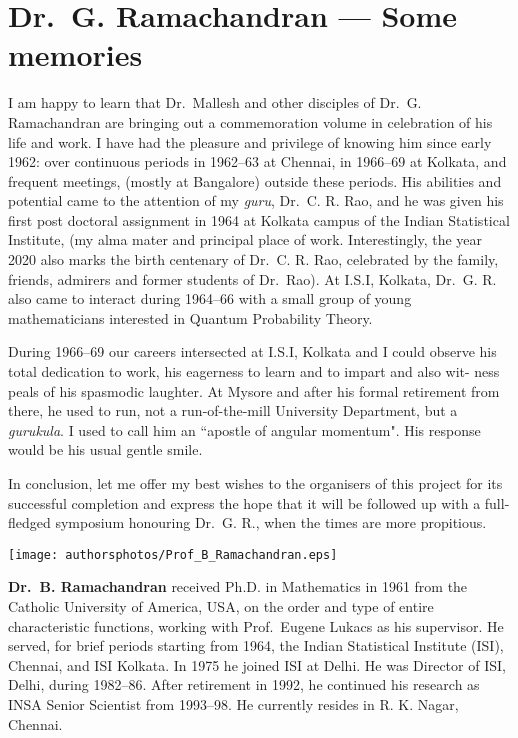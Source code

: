 \chapter{Dr.\ G. Ramachandran --- Some memories}\label{chap10}



I am happy to learn that Dr.\ Mallesh and other disciples of Dr.\ G. Ramachandran are bringing out a commemoration volume in celebration of his life
and work. I have had the pleasure and privilege of knowing him since early
1962: over continuous periods in 1962--63 at Chennai, in 1966--69 at Kolkata,
and frequent meetings, (mostly at Bangalore) outside these periods. His abilities and potential came 
to the attention of my \textit{guru}, Dr.\ C. R. Rao, and he was
given his first post doctoral assignment in 1964 at Kolkata campus of the Indian
Statistical Institute, (my alma mater and principal place of work. Interestingly,
the year 2020 also marks the birth centenary of Dr.\ C. R. Rao, celebrated by
the family, friends, admirers and former students of Dr.\ Rao). At I.S.I, Kolkata,
Dr.\ G. R. also came to interact during 1964--66 with a small group of young
mathematicians interested in Quantum Probability Theory.

During 1966--69 our careers intersected at I.S.I, Kolkata and I could observe
his total dedication to work, his eagerness to learn and to impart and also wit-
ness peals of his spasmodic laughter. At Mysore and after his formal retirement
from there, he used to run, not a run-of-the-mill University Department, but a
\textit{gurukula}. I used to call him an ``apostle of angular momentum". His response
would be his usual gentle smile.


In conclusion, let me offer my best wishes to the organisers of this project
for its successful completion and express the hope that it will be followed up
with a full-fledged symposium honouring Dr.\ G. R., when the times are more
propitious.

\centerline{\texttt{[image: authorsphotos/Prof\_B\_Ramachandran.eps]}}
\bigskip

\noindent
\textbf{Dr.\ B. Ramachandran} received Ph.D. in Mathematics in 1961 from the Catholic University of America, 
USA, on the order and type of entire characteristic functions, working with 
Prof.\ Eugene Lukacs as his supervisor. He served, for brief periods starting from 1964, the Indian 
Statistical Institute (ISI), Chennai, and ISI Kolkata. In 1975 he joined ISI at Delhi. He was Director of 
ISI, Delhi, during 1982--86. After retirement in 1992, he continued his research as INSA Senior Scientist 
from 1993--98. He currently resides in R. K. Nagar, Chennai.
